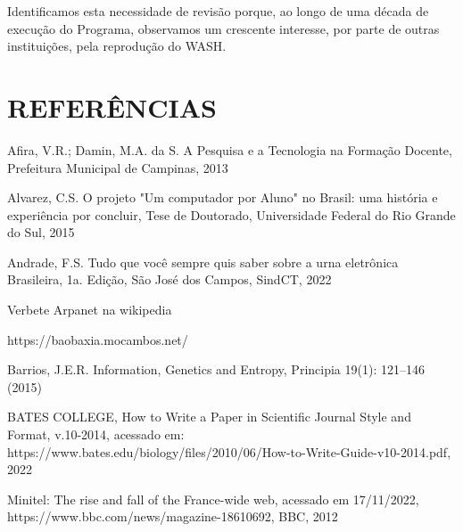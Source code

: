 Identificamos esta necessidade de revisão porque, ao longo de uma década de execução do Programa, observamos um crescente interesse, por parte de outras instituições, pela reprodução do WASH.

\chapter[REFERÊNCIAS]{REFERÊNCIAS}\label{REFERÊNCIAS}
\begin{flushleft}
[AFIRA, 2013] Afira, V.R.; Damin, M.A. da S. A Pesquisa e a Tecnologia na Formação Docente, Prefeitura Municipal de Campinas, 2013
\end{flushleft}


\begin{flushleft}
[ALVAREZ, 2015] Alvarez, C.S. O projeto "Um computador por Aluno" no Brasil: uma história e experiência por concluir, Tese de Doutorado, Universidade Federal do Rio Grande do Sul, 2015
\end{flushleft}


\begin{flushleft}
[ANDRADE, 2022] Andrade, F.S. Tudo que você sempre quis saber sobre a urna eletrônica Brasileira, 1a. Edição, São José dos Campos, SindCT, 2022
\end{flushleft}


\begin{flushleft}
[ARPANET, 2022] Verbete Arpanet na wikipedia
\end{flushleft}


\begin{flushleft}
[BAOBAXIA, 2003] https://baobaxia.mocambos.net/
\end{flushleft}


\begin{flushleft}
[BARRIOS, 2015] Barrios, J.E.R. Information, Genetics and Entropy, Principia 19(1): 121–146 (2015)
\end{flushleft}


\begin{flushleft}
[BATES, 2014] BATES COLLEGE, How to Write a Paper in Scientific Journal Style and Format, v.10-2014, acessado em: https://www.bates.edu/biology/files/2010/06/How-to-Write-Guide-v10-2014.pdf, 2022
\end{flushleft}


\begin{flushleft}
[BBC, 2012] Minitel: The rise and fall of the France-wide web, acessado em 17/11/2022, https://www.bbc.com/news/magazine-18610692, BBC, 2012
\end{flushleft}


